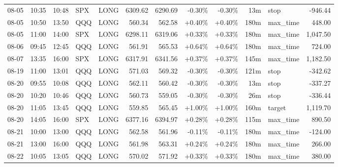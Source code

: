\documentclass[11pt,a4paper]{article}
\begin{document}
\begin{center}
\begin{longtable}{>{\color{txtmain}}l l l l l r r r r r >{\color{txtmain}}l r}
08-05 & 10:35 & 10:48 & SPX & LONG & 6309.62 & 6290.69 & \textcolor{lossred}{-0.30\%} & \textcolor{lossred}{-0.30\%} & 13m & stop & \textcolor{lossred}{-946.44} \\
08-05 & 10:50 & 13:50 & QQQ & LONG & 560.34 & 562.58 & \textcolor{wingreen}{+0.40\%} & \textcolor{wingreen}{+0.40\%} & 180m & max\_time & \textcolor{wingreen}{448.00} \\
08-05 & 11:00 & 14:00 & SPX & LONG & 6298.11 & 6319.06 & \textcolor{wingreen}{+0.33\%} & \textcolor{wingreen}{+0.33\%} & 180m & max\_time & \textcolor{wingreen}{1,047.50} \\
08-06 & 09:45 & 12:45 & QQQ & LONG & 561.91 & 565.53 & \textcolor{wingreen}{+0.64\%} & \textcolor{wingreen}{+0.64\%} & 180m & max\_time & \textcolor{wingreen}{724.00} \\
08-07 & 13:35 & 16:00 & SPX & LONG & 6317.91 & 6341.56 & \textcolor{wingreen}{+0.37\%} & \textcolor{wingreen}{+0.37\%} & 145m & max\_time & \textcolor{wingreen}{1,182.50} \\
08-19 & 11:00 & 13:01 & QQQ & LONG & 571.03 & 569.32 & \textcolor{lossred}{-0.30\%} & \textcolor{lossred}{-0.30\%} & 121m & stop & \textcolor{lossred}{-342.62} \\
08-20 & 09:55 & 10:08 & QQQ & LONG & 562.11 & 560.42 & \textcolor{lossred}{-0.30\%} & \textcolor{lossred}{-0.30\%} & 13m & stop & \textcolor{lossred}{-337.27} \\
08-20 & 10:20 & 10:46 & QQQ & LONG & 560.73 & 559.05 & \textcolor{lossred}{-0.30\%} & \textcolor{lossred}{-0.30\%} & 26m & stop & \textcolor{lossred}{-336.44} \\
08-20 & 11:05 & 13:45 & QQQ & LONG & 559.85 & 565.45 & \textcolor{wingreen}{+1.00\%} & \textcolor{wingreen}{+1.00\%} & 160m & target & \textcolor{wingreen}{1,119.70} \\
08-20 & 14:05 & 16:00 & SPX & LONG & 6377.16 & 6394.97 & \textcolor{wingreen}{+0.28\%} & \textcolor{wingreen}{+0.28\%} & 115m & max\_time & \textcolor{wingreen}{890.50} \\
08-21 & 10:00 & 13:00 & QQQ & LONG & 562.58 & 561.96 & \textcolor{lossred}{-0.11\%} & \textcolor{lossred}{-0.11\%} & 180m & max\_time & \textcolor{lossred}{-124.00} \\
08-21 & 13:00 & 16:00 & QQQ & LONG & 561.98 & 563.31 & \textcolor{wingreen}{+0.24\%} & \textcolor{wingreen}{+0.24\%} & 180m & max\_time & \textcolor{wingreen}{266.00} \\
08-22 & 10:05 & 13:05 & QQQ & LONG & 570.02 & 571.92 & \textcolor{wingreen}{+0.33\%} & \textcolor{wingreen}{+0.33\%} & 180m & max\_time & \textcolor{wingreen}{380.00} \\

\end{longtable}
\end{center}
\end{document}
